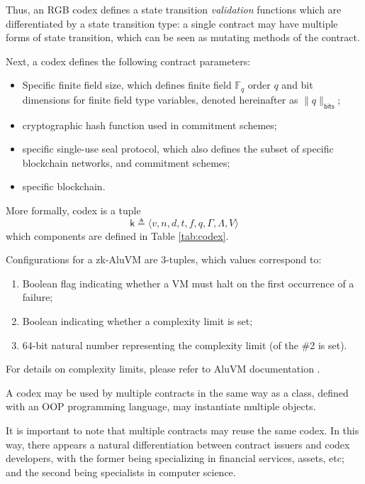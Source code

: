 \documentclass[9pt,oneside]{amsart}
\begin{document}
\begin{multicols}{2}
Thus, an RGB codex defines a state transition \emph{validation} functions
which are differentiated by a state transition type:
a single contract may have multiple forms of state transition,
which can be seen as mutating methods of the contract.

Next, a codex defines the following contract parameters:

\begin{itemize}
\item Specific finite field size, which defines finite field $\mathbb{F}_q$ order $q$ and
  bit dimensions for finite field type variables, denoted hereinafter as $\|q\|_\mathsf{bits}$;
\item cryptographic hash function used in commitment schemes;
\item specific single-use seal protocol,
  which also defines the subset of specific blockchain networks,
  and commitment schemes;
\item specific blockchain.
\end{itemize}

More formally, codex is a tuple
\noindent
\begin{equation}
\mathsf{k} \triangleq \langle v, n, d, t, f, q, \mathsf{\Gamma}, \mathsf{\Lambda}, V \rangle
\end{equation}
\noindent
which components are defined in Table \ref{tab:codex}.


Configurations for a zk-AluVM are 3-tuples, which values correspond to:
\begin{enumerate}
\item Boolean flag indicating whether a VM must halt on the first occurrence of a failure;
\item Boolean indicating whether a complexity limit is set;
\item 64-bit natural number representing the complexity limit (of the \#2 is set).
\end{enumerate}

For details on complexity limits, please refer to AluVM documentation \cite{AluVM}.

A codex may be used by multiple contracts in the same way as a class,
defined with an OOP programming language, may instantiate multiple objects.

It is important to note that multiple contracts may reuse the same codex.
In this way, there appears a natural differentiation between contract issuers and codex developers,
with the former being specializing in financial services, assets, etc;
and the second being specialists in computer science.


\end{multicols}
\end{document}

